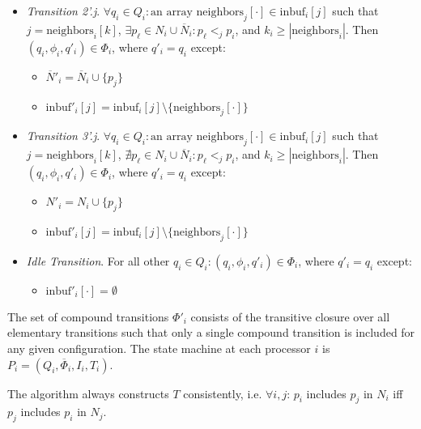 \begin{itemize}
\item \emph{Transition 2'.j}. $\forall q_i \in Q_i: \text{an array neighbors}_j[\cdot] \in \text{inbuf}_i[j]$
      such that $j = \text{neighbors}_i[k]$,
      $\exists p_{\ell} \in N_i \cup \overline{N}_i: p_{\ell} <_j p_i$,
      and $k_i \geq |\text{neighbors}_i|$.
      Then $(q_i, \phi_i, q'_i) \in \Phi_i$,
      where $q'_i = q_i$ except:
      \begin{itemize}
      \item $\overline{N}'_i = \overline{N}_i \cup \{ p_j \}$
      \item $\text{inbuf}'_i[j] = \text{inbuf}_i[j] \setminus \{\text{neighbors}_j[\cdot]\}$
      \end{itemize}
\item \emph{Transition 3'.j}. $\forall q_i \in Q_i: \text{an array neighbors}_j[\cdot] \in \text{inbuf}_i[j]$
      such that $j = \text{neighbors}_i[k]$,
      $\nexists p_{\ell} \in N_i \cup \overline{N}_i: p_{\ell} <_j p_i$,
      and $k_i \geq |\text{neighbors}_i|$.
      Then $(q_i, \phi_i, q'_i) \in \Phi_i$,
      where $q'_i = q_i$ except:
      \begin{itemize}
      \item $N'_i = N_i \cup \{ p_j \}$
      \item $\text{inbuf}'_i[j] = \text{inbuf}_i[j] \setminus \{\text{neighbors}_j[\cdot]\}$
      \end{itemize}
\item \emph{Idle Transition}. For all other $q_i \in Q_i: (q_i, \phi_i, q'_i) \in \Phi_i$,
      where $q'_i = q_i$ except:
      \begin{itemize}
      \item $\text{inbuf}'_i[\cdot] = \emptyset$
      \end{itemize}
\end{itemize}

The set of compound transitions $\Phi'_i$ consists of the transitive closure over all elementary
transitions such that only a single compound transition is included for any given configuration.
The state machine at each processor $i$ is
$P_i = (Q_i, \overline{\Phi}_i, I_i, T_i)$.

\begin{theorem} \label{thm:tconsistent}
The algorithm always constructs $T$ consistently, i.e. $\forall i, j$:
$p_i$ includes $p_j$ in $N_i$ iff $p_j$ includes $p_i$ in $N_j$.
\end{theorem}

